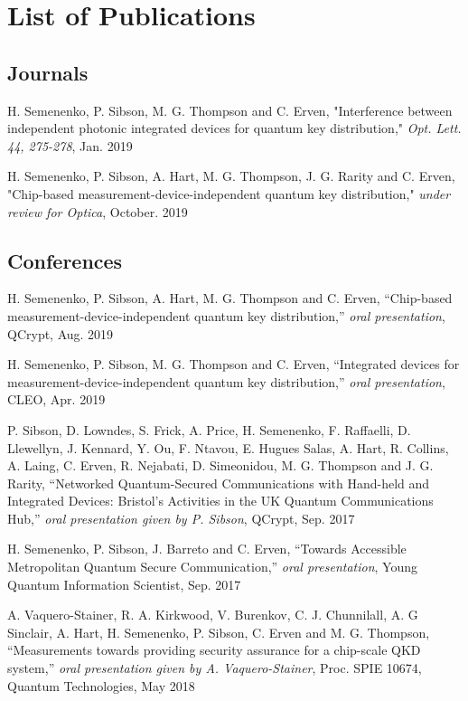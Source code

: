%
{\setlength{\parindent}{0pt} %
\abnormalparskip{18pt} %
\chapter*{List of Publications}
\vspace*{-1.5cm}
\section*{Journals}

H. Semenenko, P. Sibson, M. G. Thompson and C. Erven, "Interference between independent photonic integrated devices for quantum key distribution," \textit{Opt. Lett. 44, 275-278}, Jan. 2019 

H. Semenenko, P. Sibson, A. Hart, M. G. Thompson, J. G. Rarity  and C. Erven, "Chip-based measurement-device-independent quantum key distribution," \textit{under review for Optica}, October. 2019 

\section*{Conferences}

H. Semenenko, P. Sibson, A. Hart, M. G. Thompson and C. Erven, ``Chip-based measurement-device-independent quantum key distribution,'' \textit{oral presentation}, QCrypt, Aug. 2019

H. Semenenko, P. Sibson, M. G. Thompson and C. Erven, ``Integrated devices for measurement-device-independent quantum key distribution,'' \textit{oral presentation}, CLEO, Apr. 2019

P. Sibson, D. Lowndes, S. Frick, A. Price, H. Semenenko, F. Raffaelli, D. Llewellyn, J. Kennard, Y. Ou, F. Ntavou, E. Hugues Salas, A. Hart, R. Collins, A. Laing, C. Erven, R. Nejabati, D. Simeonidou, M. G. Thompson and J. G. Rarity, ``Networked Quantum-Secured Communications with Hand-held and Integrated Devices: Bristol’s Activities in the UK Quantum Communications Hub,'' \textit{oral presentation given by P. Sibson}, QCrypt, Sep. 2017

H. Semenenko, P. Sibson, J. Barreto and C. Erven, ``Towards Accessible Metropolitan Quantum Secure Communication,'' \textit{oral presentation}, Young Quantum Information Scientist, Sep. 2017 

A. Vaquero-Stainer, R. A. Kirkwood, V. Burenkov, C. J. Chunnilall, A. G Sinclair, A. Hart, H. Semenenko, P. Sibson, C. Erven and M. G. Thompson, ``Measurements towards providing security assurance for a chip-scale QKD system,'' \textit{oral presentation given by A. Vaquero-Stainer}, Proc. SPIE 10674, Quantum Technologies, May 2018

}
